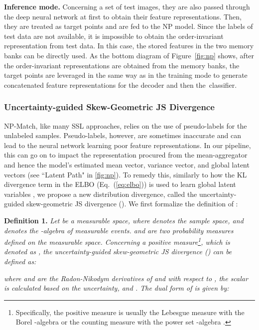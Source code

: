 \documentclass[nohyperref]{article}
\theoremstyle{plain}
\theoremstyle{definition}
\theoremstyle{remark}
\begin{document}
{\bf Inference mode.} Concerning a set of test images, they are also passed through the deep neural network at first to obtain their feature representations. Then, they are treated as target points and are fed to the NP model. Since 
the labels of test data are not available, it is impossible to obtain the order-invariant representation from test data. In this case, the stored features in the two memory banks can be directly used. As the bottom diagram of Figure~\ref{fig:np} shows, after the order-invariant representations are obtained from the memory banks, the target points are leveraged in the same way as in the training mode to generate concatenated feature representations for the decoder  and then the~classifier. 

\subsubsection{Uncertainty-guided Skew-Geometric JS Divergence} 
\label{sec:ugjs}
NP-Match, like many SSL approaches, relies on the use of pseudo-labels for the unlabeled samples. Pseudo-labels, however, are sometimes inaccurate and can lead to the neural network learning poor feature representations. In our pipeline, this can go on to impact the representation procured from the mean-aggregator and hence the model's estimated mean vector, variance vector, and global latent vectors (see ``Latent Path" in \cref{fig:np}).
To remedy this, similarly to how the KL divergence term in the ELBO (Eq.~(\ref{eq:elbo})) is used to learn global latent variables \cite{garnelo2018neural}, we propose a new distribution divergence, called the uncertainty-guided skew-geometric JS divergence (). We first formalize the definition of :
 
{\bf Definition 1.} \emph{Let  be a measurable space, where  denotes the sample space, and  denotes the -algebra of measurable events.  and  are two probability measures defined on the measurable space. Concerning a positive measure\footnote{Specifically, the positive measure is usually the Lebesgue measure with the Borel -algebra  or the counting measure with the power set -algebra .}, which is denoted as , the uncertainty-guided skew-geometric JS divergence () can be defined as: }
 
\emph{where  and  are the Radon-Nikodym derivatives of  and  with respect to ,  the scalar  is  calculated based on the uncertainty, and   . The dual form of  is given by: 
}
 
\end{document}
